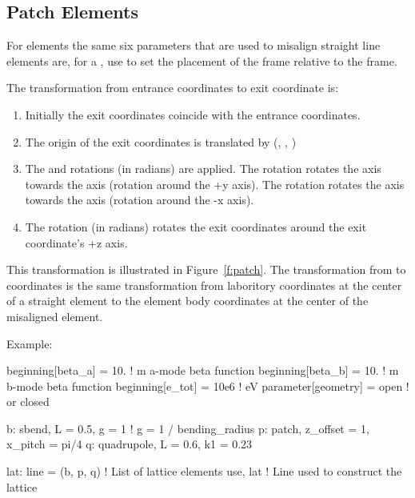 \documentclass{hitec}
\begin{document}
\subsection{Patch Elements}

For  elements the same six parameters that are used to misalign straight line elements
are, for a , use to set the placement of the  frame relative to the 
frame.

The transformation from entrance coordinates to exit coordinate is:
\begin{enumerate}
\item Initially the exit coordinates coincide with the entrance coordinates.
\item The origin of the exit coordinates is translated by (, , )
\item The  and  rotations (in radians) are applied. 
The  rotation rotates the  axis
towards the  axis (rotation around the +y axis). The  rotation rotates the  axis
towards the  axis (rotation around the -x axis).
\item The  rotation (in radians) rotates the exit coordinates around the exit coordinate's +z
axis.
\end{enumerate}
This transformation is illustrated in Figure~\ref{f:patch}. The transformation from 
 to  coordinates is the same transformation from laboritory coordinates at the
center of a straight element to the element body coordinates at the center of the misaligned
element.

Example:
{\small
\begin{code}
beginning[beta_a] = 10.   ! m  a-mode beta function
beginning[beta_b] = 10.   ! m  b-mode beta function
beginning[e_tot] = 10e6   ! eV
parameter[geometry] = open  ! or closed

b: sbend, L = 0.5, g = 1    ! g = 1 / bending_radius
p: patch, z_offset = 1, x_pitch = pi/4
q: quadrupole, L = 0.6, k1 = 0.23

lat: line = (b, p, q)   ! List of lattice elements
use, lat                ! Line used to construct the lattice
\end{code}}
\end{document}
